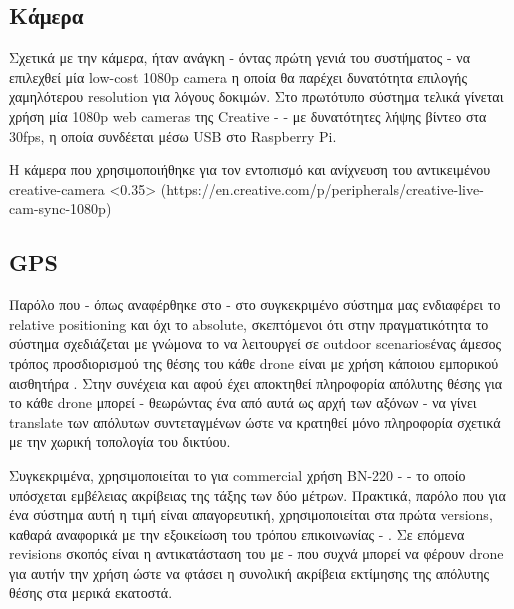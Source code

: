 
\subsection{Κάμερα}
Σχετικά με την κάμερα, ήταν ανάγκη - όντας πρώτη γενιά του συστήματος -  να επιλεχθεί μία low-cost 1080p camera η οποία θα παρέχει δυνατότητα επιλογής χαμηλότερου resolution για λόγους δοκιμών. Στο πρωτότυπο σύστημα τελικά γίνεται χρήση μία 1080p web cameras της Creative \cite{creative-camera} -  - με δυνατότητες λήψης βίντεο στα 30fps, η οποία συνδέεται μέσω USB στο Raspberry Pi.

%
{Η κάμερα που χρησιμοποιήθηκε για τον εντοπισμό και ανίχνευση του αντικειμένου}%
{creative-camera}%
<0.35>%
(https://en.creative.com/p/peripherals/creative-live-cam-sync-1080p)



\subsection{GPS} \label{sec:GPS}
Παρόλο που - όπως αναφέρθηκε στο  - στο συγκεκριμένο σύστημα μας ενδιαφέρει το relative positioning και όχι το absolute, σκεπτόμενοι ότι στην πραγματικότητα το σύστημα σχεδιάζεται με γνώμονα το να λειτουργεί σε outdoor scenarios\udot ένας άμεσος τρόπος προσδιορισμού της θέσης του κάθε drone είναι με χρήση κάποιου εμπορικού αισθητήρα . Στην συνέχεια και αφού έχει αποκτηθεί πληροφορία απόλυτης θέσης για το κάθε drone μπορεί - θεωρώντας ένα από αυτά ως αρχή των αξόνων - να γίνει translate των απόλυτων συντεταγμένων ώστε να κρατηθεί μόνο πληροφορία σχετικά με την χωρική τοπολογία του δικτύου.

Συγκεκριμένα, χρησιμοποιείται το  για commercial χρήση ΒΝ-220 \cite{bn-220-gps} -  - το οποίο υπόσχεται εμβέλειας ακρίβειας της τάξης των δύο μέτρων. Πρακτικά, παρόλο που για ένα  σύστημα αυτή η τιμή είναι απαγορευτική, χρησιμοποιείται στα πρώτα versions, καθαρά αναφορικά με την εξοικείωση του τρόπου επικοινωνίας  - . Σε επόμενα revisions σκοπός είναι η αντικατάσταση του με - που συχνά μπορεί να φέρουν drone για αυτήν την χρήση ώστε να φτάσει η συνολική ακρίβεια εκτίμησης της απόλυτης θέσης στα μερικά εκατοστά. 

